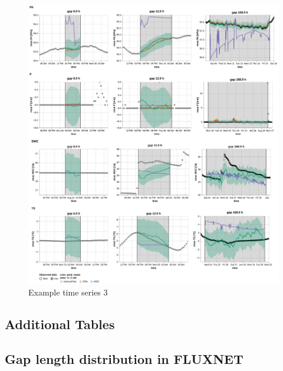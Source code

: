 \documentclass{article}
\newcommand{\imgwidth}{6in}
\let\Oldsubsection\subsection
\renewcommand{\subsection}{\FloatBarrier\Oldsubsection}
\begin{document}
\begin{figure}
\centerline{\includegraphics[width=\imgwidth]{images2/timeseries_2_2}}
\caption{Example time series 3}
\label{fig:ts_3-2}
\end{figure}
\subsection{Additional Tables}

\newcommand{\CapGapLen}{Imputation performance of the Kalman filter in comparison to the state-of-the-art
methods: ERA-Interim (ERA-I) and Marginal Distribution Sampling (MDS), using mean and standard deviation of the \textit{Root Mean Square Error} (RMSE). The best method for each gap length is highlighted in bold.}











\subsection{Gap length distribution in FLUXNET}
\end{document}
